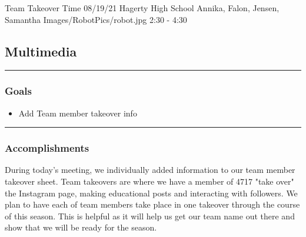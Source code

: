 \insertmeeting 
	{Team Takeover Time} 
	{08/19/21}
	{Hagerty High School}
	{Annika, Falon, Jensen, Samantha}
	{Images/RobotPics/robot.jpg}
	{2:30 - 4:30}
	
\subsection*{Multimedia}
\noindent\hfil\rule{\textwidth}{.4pt}\hfil
\subsubsection*{Goals}
\begin{itemize}
    \item Add Team member takeover info  

\end{itemize} 

\noindent\hfil\rule{\textwidth}{.4pt}\hfil

\subsubsection*{Accomplishments}
During today's meeting, we individually added information to our team member takeover sheet. Team takeovers are where we have a member of 4717 "take over" the Instagram page, making educational posts and interacting with followers. We plan to have each of team members take place in one takeover through the course of this season. This is helpful as it will help us get our team name out there and show that we will be ready for the season.